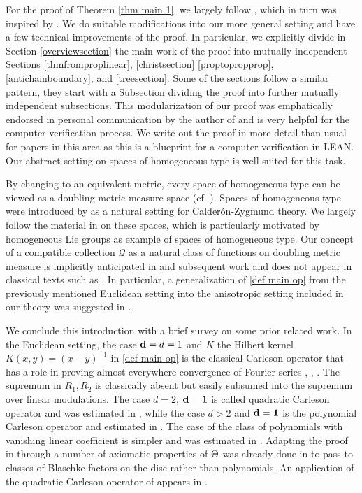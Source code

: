 For the proof of Theorem \ref{thm main 1}, we largely follow \cite{zk-polynomial}, which in turn was inspired by \cite{lie-polynomial}.
We do suitable modifications into our more general setting and have a few technical improvements of the proof.  In particular, we explicitly divide
in Section \ref{overviewsection} the main work of the proof into mutually independent
Sections \ref{thmfromproplinear}, \ref{christsection}
\ref{proptopropprop},
\ref{antichainboundary},
and \ref{treesection}. Some of the sections follow a similar
pattern, they start with a Subsection dividing the
proof into further mutually independent subsections.
This modularization of our proof was emphatically endorsed in personal communication by the author of \cite{zk-polynomial} and is very helpful for the
computer verification process.
We write out the proof in more detail than usual
for papers in this area as this is a blueprint for a computer verification in LEAN.
Our abstract setting on spaces of homogeneous type
is well suited for this task.


By changing to an equivalent metric, every space of homogeneous type can be viewed as a doubling metric measure space (cf. \cite{MaciasSegovia}). Spaces of homogeneous type were introduced
by \cite{MR0499948} as a natural setting for Calder\'on-Zygmund theory. We largely follow the material in \cite{stein-book} on these spaces,
which is  particularly motivated by
homogeneous Lie groups as example of spaces of homogeneous type.
Our concept of a compatible collection $\mathcal{Q}$ as a natural class
of functions on doubling metric measure is implicitly anticipated in \cite{zk-polynomial} and subsequent
work \cite{mnatsakanyan} and does not appear in classical texts such as \cite{stein-book}. In particular, a generalization of \eqref{def main op} from the previously mentioned Euclidean setting into the anisotropic setting included in our theory was suggested in \cite{zk-polynomial}.



We conclude this introduction with a brief survey on some prior related work. In the Euclidean setting, the case  ${\bf d}=d=1$ and $K$ the Hilbert kernel
$K(x,y)=(x-y)^{-1}$ in \eqref{def main op} is the classical
Carleson operator that has a role in proving
almost everywhere convergence of Fourier series
\cite{carleson}, \cite{fefferman}, \cite{lacey-thiele}.
The supremum in $R_1,R_2$ is classically absent but easily subsumed into the supremum over linear modulations.
The case $d=2$, ${\bf{d}=1}$ is called quadratic Carleson operator and
was estimated in \cite{lie-quadratic}, while the case $d>2$ and
${\bf{d}=1}$ is the polynomial Carleson operator and estimated in  \cite{lie-polynomial}. The case of the class of polynomials with
vanishing linear coefficient is simpler and was estimated in \cite{stein-wainger}.
Adapting the proof in \cite{zk-polynomial} through
a number of axiomatic properties of $\Theta$ was already done
in  \cite{mnatsakanyan} to pass to classes of Blaschke factors on the disc rather than polynomials. An application of the quadratic Carleson
operator of \cite{lie-quadratic} appears in \cite{ramos}. 

